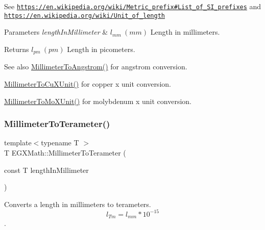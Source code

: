 See \href{https://en.wikipedia.org/wiki/Metric_prefix#List_of_SI_prefixes}{\tt https\+://en.\+wikipedia.\+org/wiki/\+Metric\+\_\+prefix\#\+List\+\_\+of\+\_\+\+S\+I\+\_\+prefixes} and \href{https://en.wikipedia.org/wiki/Unit_of_length}{\tt https\+://en.\+wikipedia.\+org/wiki/\+Unit\+\_\+of\+\_\+length} 
\begin{DoxyParams}{Parameters}
{\em length\+In\+Millimeter} & $ l_{mm}\ (mm)$ Length in millimeters. \\
\hline
\end{DoxyParams}
\begin{DoxyReturn}{Returns}
$ l_{pm}\ (pm)$ Length in picometers. 
\end{DoxyReturn}
\begin{DoxySeeAlso}{See also}
\mbox{\hyperlink{group___e_g_x_math-_conversions-_length_conversions-_s_i-_millimeter-_non-_s_i_ga40e4659f4689e5be54f8e28fd8ce0008}{Millimeter\+To\+Angstrom()}} for angstrom conversion. 

\mbox{\hyperlink{group___e_g_x_math-_conversions-_length_conversions-_s_i-_millimeter-_non-_s_i_gaa9a94e1f42047955530f673047c4370b}{Millimeter\+To\+Cu\+X\+Unit()}} for copper x unit conversion. 

\mbox{\hyperlink{group___e_g_x_math-_conversions-_length_conversions-_s_i-_millimeter-_non-_s_i_ga1f0be98bc702f46a69579b27e05a2439}{Millimeter\+To\+Mo\+X\+Unit()}} for molybdenum x unit conversion. 
\end{DoxySeeAlso}
\mbox{\label{group___e_g_x_math-_conversions-_length_conversions-_s_i-_millimeter-_s_i_ga0bd88917339b280d5df05adfddc6661a}} 
\subsubsection{\texorpdfstring{Millimeter\+To\+Terameter()}{MillimeterToTerameter()}}
{\footnotesize\ttfamily template$<$typename T $>$ \\
T E\+G\+X\+Math\+::\+Millimeter\+To\+Terameter (\begin{DoxyParamCaption}\item[{const T}]{length\+In\+Millimeter }\end{DoxyParamCaption})}



Converts a length in millimeters to terameters. \[ l_{Tm}=l_{mm} * 10^{-15} \]. 

